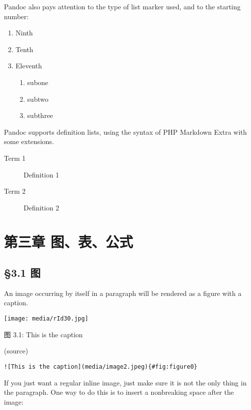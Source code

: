 \documentclass[
]{article}
\begin{document}
Pandoc also pays attention to the type of list marker used, and to the
starting number:

\begin{enumerate}
\def\labelenumi{\arabic{enumi})}
\setcounter{enumi}{8}
\item
  Ninth
\item
  Tenth
\item
  Eleventh

  \begin{enumerate}
  \def\labelenumii{\roman{enumii}.}
  \item
    subone
  \item
    subtwo
  \item
    subthree
  \end{enumerate}
\end{enumerate}

Pandoc supports definition lists, using the syntax of PHP Markdown Extra
with some extensions.

\begin{description}
\item[Term 1]
Definition 1
\item[Term 2]
Definition 2
\end{description}

\hypertarget{ux7b2cux4e09ux7ae0-ux56feux8868ux516cux5f0f}{%
\section{第三章
图、表、公式}\label{ux7b2cux4e09ux7ae0-ux56feux8868ux516cux5f0f}}

\hypertarget{ux56fe}{%
\subsection{§3.1 图}\label{ux56fe}}

An image occurring by itself in a paragraph will be rendered as a figure
with a caption.

\texttt{[image: media/rId30.jpg]}

图 3.1: This is the caption

(source)

\begin{verbatim}
![This is the caption](media/image2.jpeg){#fig:figure0}
\end{verbatim}

If you just want a regular inline image, just make sure it is not the
only thing in the paragraph. One way to do this is to insert a
nonbreaking space after the image:
\end{document}
